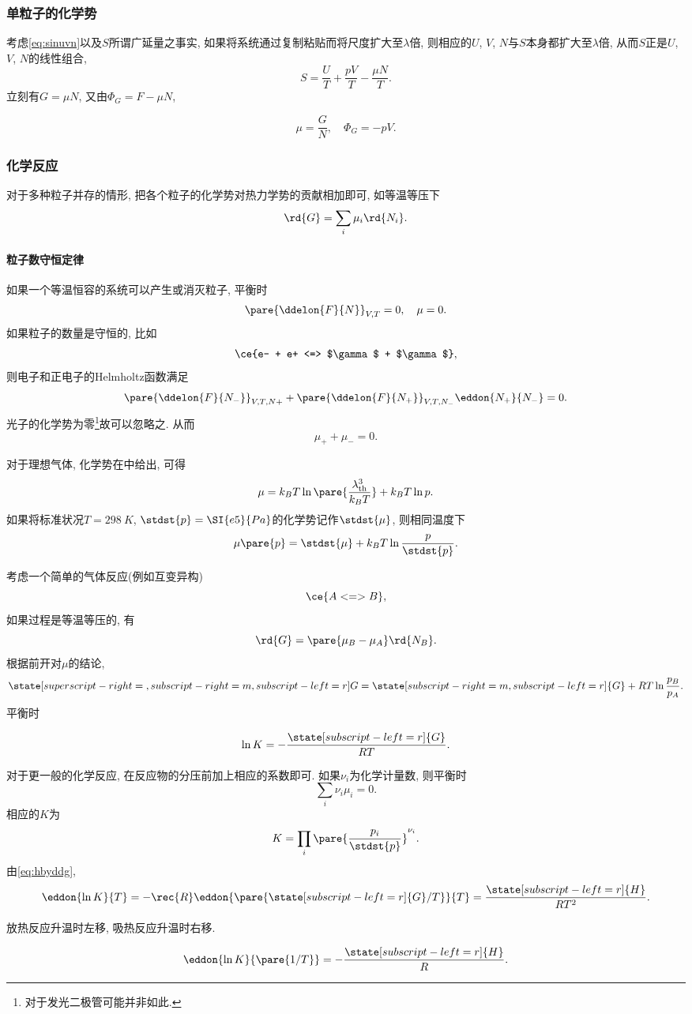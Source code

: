 \documentclass[../Thermal.tex]{subfiles}
\begin{document}
\subsubsection{单粒子的化学势}
考虑\eqref{eq:sinuvn}以及$S$所谓广延量之事实, 如果将系统通过复制粘贴而将尺度扩大至$\lambda$倍, 则相应的$U$, $V$, $N$与$S$本身都扩大至$\lambda$倍, 从而$S$正是$U$, $V$, $N$的线性组合,
\[ S = \frac{U}{T} + \frac{pV}{T} - \frac{\mu N}{T}. \]
立刻有$G=\mu N$, 又由$\Phi_G = F - \mu N$,
\begin{finale}
\begin{equation}
\label{eq:muGNandPhiGpV}
\mu = \frac{G}{N},\quad \Phi_G = -pV.
\end{equation}
\end{finale}
\subsubsection{化学反应}
对于多种粒子并存的情形, 把各个粒子的化学势对热力学势的贡献相加即可, 如等温等压下
\[ \rd{G} = \sum_i \mu_i \rd{N_i}. \]
\paragraph{粒子数守恒定律} 如果一个等温恒容的系统可以产生或消灭粒子, 平衡时
\[ \pare{\ddelon{F}{N}}_{V,T} = 0,\quad \mu = 0. \]
如果粒子的数量是守恒的, 比如
\[ \ce{e- + e+ <=> $\gamma$ + $\gamma$}, \]
则电子和正电子的Helmholtz函数满足
\[ \pare{\ddelon{F}{N_-}}_{V,T,N+} + \pare{\ddelon{F}{N_+}}_{V,T,N_-} \eddon{N_+}{N_-} = 0. \]
光子的化学势为零\footnote{对于发光二极管可能并非如此.}故可以忽略之. 从而
\[ \mu_+ + \mu_- = 0. \]
\begin{ex}
对于理想气体, 化学势在中给出, 可得
\[ \mu = k_BT\ln\pare{\frac{\lambda_{\mathrm{th}}^3}{k_B T}} + k_B T\ln p. \]
如果将标准状况$T=\SI{298}{K}$, $\stdst{p}=\SI{e5}{Pa}$的化学势记作$\stdst{\mu}$, 则相同温度下
\[ \mu\pare{p} = \stdst{\mu} + k_BT\ln\frac{p}{\stdst{p}}. \]
\end{ex}
考虑一个简单的气体反应(例如互变异构)
\[ \ce{A <=> B}, \]
如果过程是等温等压的, 有
\[ \rd{G} = \pare{\mu_B -\mu_A}\rd{N_B}. \]
根据前开对$\mu$的结论,
\[ \state[superscript-right={},subscript-right=m,subscript-left=r]{G} = \state[subscript-right=m,subscript-left=r]{G} + RT\ln\frac{p_B}{p_A}. \]
平衡时
\begin{finale}
\[ \ln K = -\frac{\state[subscript-left=r]{G}}{RT}. \]
\end{finale}
对于更一般的化学反应, 在反应物的分压前加上相应的系数即可. 如果$\nu_i$为化学计量数, 则平衡时
\[ \sum_i \nu_i \mu_i = 0. \]
相应的$K$为
\[ K = \prod_i \pare{\frac{p_i}{\stdst{p}}}^{\nu_i}. \]
由\eqref{eq:hbyddg},
\[ \eddon{\ln K}{T} = -\rec{R}\eddon{\pare{\state[subscript-left=r]{G}/T}}{T} = \frac{\state[subscript-left=r]{H}}{RT^2}. \]
\begin{corollary}[le Chatelier原理]
放热反应升温时左移, 吸热反应升温时右移.
\end{corollary}
\begin{corollary}
\[ \eddon{\ln K}{\pare{1/T}} = -\frac{\state[subscript-left=r]{H}}{R}. \]
\end{corollary}
\end{document}
